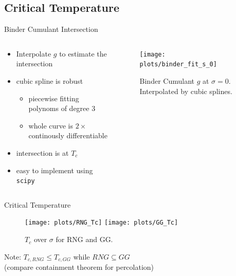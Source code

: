 \documentclass{beamer}
\begin{document}
    \subsection{Critical Temperature}
        \begin{frame}{Binder Cumulant Intersection}
            \begin{columns}[t]
                \begin{column}{5cm}
                    \begin{itemize}[<+->]
                        \item Interpolate \(g\) to estimate the intersection
                        \item cubic spline is robust
                        \begin{itemize}[<+->]
                            \item piecewise fitting polynoms of degree 3
                            \item whole curve is \(2 \times\) continously differentiable
                        \end{itemize}
                        \item intersection is at \(T_{c}\) \cite{Binder1981}
                        \item easy to implement using \texttt{scipy}
                    \end{itemize}
                \end{column}
                \begin{column}{6cm}
                    \begin{figure}[htbp]
                        \centering
                        \texttt{[image: plots/binder\_fit\_s\_0]}
                        \caption
                        {
                            Binder Cumulant \(g\) at \(\sigma = 0\).
                            Interpolated by cubic splines.
                        }
                        \label{fig:gettingCrit:binder_fit_s_0}
                    \end{figure}
                \end{column}
            \end{columns}
        \end{frame}

        \begin{frame}{Critical Temperature}
            \begin{figure}[htbp]
                \centering
                \subfigure
                {
                    \label{sfig:Tc:RNG}
                    \texttt{[image: plots/RNG\_Tc]}
                }
                \subfigure
                {
                    \label{sfig:Tc:GG}
                    \texttt{[image: plots/GG\_Tc]}
                }
                \caption
                {
                    \(T_c\) over \(\sigma\) for RNG and GG.
                }
                \label{fig:Tc}
            \end{figure}
            \pause
            Note: \(T_{c,RNG} \le T_{c,GG}\) while \(RNG \subseteq GG\)\\
            (compare containment theorem for percolation)
        \end{frame}
\end{document}

